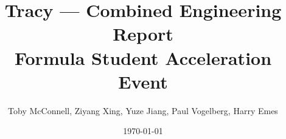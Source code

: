 \documentclass[11pt, a4paper]{report}
\title{Tracy --- Combined Engineering Report \\ Formula Student Acceleration Event}
\author{Toby McConnell, Ziyang Xing, Yuze Jiang, Paul Vogelberg, Harry Emes}
\date{\today}
\numberwithin{equation}{section}
\begin{document}

\maketitle
\newpage

\setcounter{page}{1}

\tableofcontents
\newpage

\begin{refsection}
\graphicspath{{../TobyMcConnell/Engineering/}}

\end{refsection}

\begin{refsection}
\graphicspath{{../MichaelZiyangXing/}}

\printbibliography
\end{refsection}

\begin{refsection}
\graphicspath{{yuze_assets/Engineering/}}

\end{refsection}

\begin{refsection}
\graphicspath{{../PaulVogelberg/Engineering/}}

\end{refsection}

\begin{refsection}
\graphicspath{{../HarryEmes/Engineering/}{../../figures/}}

\end{refsection}
\end{document}
